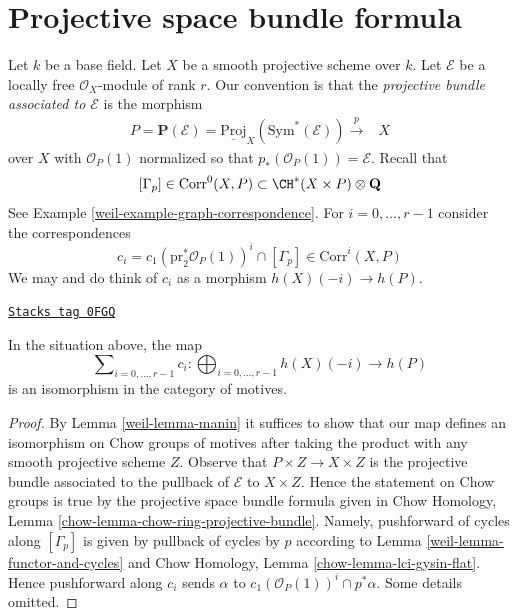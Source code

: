 \section{Projective space bundle formula}
\label{weil-section-projective-space-bundle}
Let $k$ be a base field. Let $X$ be a smooth projective scheme over $k$.
Let $\mathcal{E}$ be a locally free $\mathcal{O}_X$-module of rank $r$.
Our convention is that the {\it projective bundle associated to
$\mathcal{E}$} is the morphism
$$
\begin{array}{cc}P = \mathbf{P}(\mathcal{E}) =
\underline{\text{Proj}}_X(\text{Sym}^*(\mathcal{E}))
\overset{p}{\longrightarrow} & X\end{array}
$$
over $X$ with $\mathcal{O}_P(1)$ normalized so that
$p_*(\mathcal{O}_P(1)) = \mathcal{E}$. Recall that
$$
[\Gamma_p] \in \text{Corr}^0(X, P) \subset \CH^*(X \times P) \otimes \mathbf{Q}
$$
See Example \ref{weil-example-graph-correspondence}.
For $i = 0, \ldots, r - 1$ consider the correspondences
$$
c_i = c_1(\text{pr}_2^*\mathcal{O}_P(1))^i \cap [\Gamma_p]
\in \text{Corr}^i(X, P)
$$
We may and do think of $c_i$ as a morphism $h(X)(-i) \to h(P)$.

\begin{lemma}

\label{weil-lemma-projective-space-bundle-formula}
\href{https://stacks.math.columbia.edu/tag/0FGQ}{\texttt{Stacks tag 0FGQ}}

In the situation above, the map
$$
\sum\nolimits_{i = 0, \ldots, r - 1} c_i :
\bigoplus\nolimits_{i = 0, \ldots, r - 1} h(X)(-i)
\longrightarrow
h(P)
$$
is an isomorphism in the category of motives.
\end{lemma}

\begin{proof}

By Lemma \ref{weil-lemma-manin} it suffices to show that
our map defines an isomorphism on Chow groups of motives
after taking the product with any smooth projective scheme $Z$.
Observe that $P \times Z \to X \times Z$ is the projective
bundle associated to the pullback of $\mathcal{E}$ to $X \times Z$.
Hence the statement on Chow groups is true by the projective space bundle
formula given in
Chow Homology, Lemma \ref{chow-lemma-chow-ring-projective-bundle}.
Namely, pushforward of cycles along $[\Gamma_p]$ is given by pullback
of cycles by $p$ according to Lemma \ref{weil-lemma-functor-and-cycles} and
Chow Homology, Lemma \ref{chow-lemma-lci-gysin-flat}. Hence pushforward
along $c_i$ sends $\alpha$ to $c_1(\mathcal{O}_P(1))^i \cap p^*\alpha$.
Some details omitted.
\end{proof}

